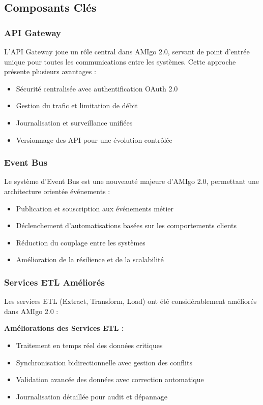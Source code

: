 \subsection{Composants Clés}

\subsubsection{API Gateway}

L'API Gateway joue un rôle central dans AMIgo 2.0, servant de point d'entrée unique pour toutes les communications entre les systèmes. Cette approche présente plusieurs avantages :

\begin{itemize}
    \item Sécurité centralisée avec authentification OAuth 2.0
    \item Gestion du trafic et limitation de débit
    \item Journalisation et surveillance unifiées
    \item Versionnage des API pour une évolution contrôlée
\end{itemize}

\subsubsection{Event Bus}

Le système d'Event Bus est une nouveauté majeure d'AMIgo 2.0, permettant une architecture orientée événements :

\begin{itemize}
    \item Publication et souscription aux événements métier
    \item Déclenchement d'automatisations basées sur les comportements clients
    \item Réduction du couplage entre les systèmes
    \item Amélioration de la résilience et de la scalabilité
\end{itemize}

\subsubsection{Services ETL Améliorés}

Les services ETL (Extract, Transform, Load) ont été considérablement améliorés dans AMIgo 2.0 :

\begin{mdframed}[backgroundcolor=lightblue, linewidth=0pt, innerleftmargin=10pt, innerrightmargin=10pt]
\textbf{Améliorations des Services ETL :}
\begin{itemize}
    \item Traitement en temps réel des données critiques
    \item Synchronisation bidirectionnelle avec gestion des conflits
    \item Validation avancée des données avec correction automatique
    \item Journalisation détaillée pour audit et dépannage
\end{itemize}
\end{mdframed}

